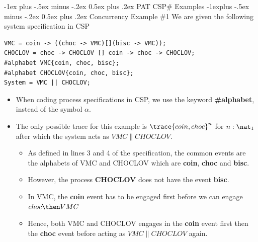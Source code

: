 \documentclass[10pt, landscape]{article}
\makeatletter
\renewcommand{\section}{\@startsection{section}{1}{0mm}%
  {-1ex plus -.5ex minus -.2ex}%
  {0.5ex plus .2ex}%
{\normalfont\large\bfseries}}
\renewcommand{\subsection}{\@startsection{subsection}{2}{0mm}%
  {-1explus -.5ex minus -.2ex}%
  {0.5ex plus .2ex}%
{\normalfont\normalsize\bfseries}}
\makeatother
\begin{document}
\begin{multicols*}{2}
  \section{PAT CSP\# Examples}
  \subsection{Concurrency Example \#1}
  We are given the following system specification in CSP
\begin{lstlisting}
VMC = coin -> ((choc -> VMC)[](bisc -> VMC));
CHOCLOV = choc -> CHOCLOV [] coin -> choc -> CHOCLOV;
#alphabet VMC{coin, choc, bisc};
#alphabet CHOCLOV{coin, choc, bisc};
System = VMC || CHOCLOV;
\end{lstlisting}
  
  \begin{itemize}
  \item When coding process specifications in CSP, we use the keyword \textbf{\#alphabet}, instead of the symbol $\alpha$.
  \item The only possible trace for this example is $\trace{coin, choc}^{n}$ for $n : \nat_1$ after which the system acts as $VMC \parallel CHOCLOV$.
  \begin{itemize}
      \item As defined in lines 3 and 4 of the specification, the common events are the alphabets of VMC and CHOCLOV which are \textbf{coin}, \textbf{choc} and \textbf{bisc}.
      \item However, the process \textbf{CHOCLOV} does not have the event \textbf{bisc}.
      \item In VMC, the \textbf{coin} event has to be engaged first before we can engage $choc \then VMC$
      \item Hence, both VMC and CHOCLOV engages in the \textbf{coin} event first then the \textbf{choc} event before acting as $VMC \parallel CHOCLOV$ again.
  \end{itemize}
  \end{itemize}
  

\end{multicols*}
\end{document}
